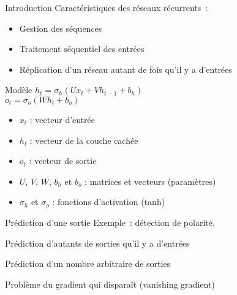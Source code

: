 \begin{frame}{Introduction}
  Caractéristiques des réseaux récurrents~:

  \begin{itemize}[<+->]
    \item Gestion des séquences
    \item Traitement séquentiel des entrées
    \item Réplication d'un réseau autant de fois qu'il y a d'entrées
  \end{itemize}
\end{frame}

\begin{frame}{Modèle}
  $h_{t}=\sigma_{h}(Ux_{t}+Vh_{t-1}+b_{h})$ \\
  $o_{t}=\sigma_{o}(Wh_{t}+b_{o})$ \\
  \begin{itemize}
  \item $x_{t}$ : vecteur d'entrée
  \item $h_t$ : vecteur de la couche cachée
  \item $o_{t}$ : vecteur de sortie
  \item $U$, $V$, $W$, $b_h$ et $b_o$ : matrices et vecteurs (paramètres)
  \item $\sigma_{h}$ et $\sigma_o$ : fonctions d'activation (tanh)
  \end{itemize}
\end{frame}

\begin{frame}{Prédiction d'une sortie}
  Exemple~: détection de polarité.

  \begin{figure}
    \centering
  \end{figure}
\end{frame}

\begin{frame}{Prédiction d'autants de sorties qu'il y a d'entrées}
\end{frame}

\begin{frame}{Prédiction d'un nombre arbitraire de sorties}
\end{frame}

\begin{frame}{Problème du gradient qui disparaît (vanishing gradient)}
\end{frame}
